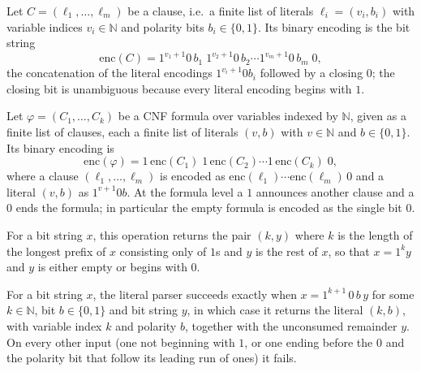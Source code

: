 \begin{definition}
\label{Std.Sat.CNF.serializeClause}
\leanok
{}
Let $C = (\ell_1, \dots, \ell_m)$ be a clause, i.e.\ a finite list of literals
$\ell_i = (v_i, b_i)$ with variable indices $v_i \in \mathbb{N}$ and polarity bits
$b_i \in \{0,1\}$. Its binary encoding is the bit string
\[
  \mathrm{enc}(C) = 1^{v_1+1}0\,b_1\;1^{v_2+1}0\,b_2 \cdots 1^{v_m+1}0\,b_m\;0,
\]
the concatenation of the literal encodings $1^{v_i+1}0b_i$ followed by a closing $0$; the
closing bit is unambiguous because every literal encoding begins with $1$.
\end{definition}

\begin{definition}
\label{Std.Sat.CNF.serialize}
\leanok
{}
Let $\varphi = (C_1, \dots, C_k)$ be a CNF formula over variables indexed by $\mathbb{N}$,
given as a finite list of clauses, each a finite list of literals $(v,b)$ with
$v \in \mathbb{N}$ and $b \in \{0,1\}$. Its binary encoding is
\[
  \mathrm{enc}(\varphi) = 1\,\mathrm{enc}(C_1)\;1\,\mathrm{enc}(C_2) \cdots 1\,\mathrm{enc}(C_k)\;0,
\]
where a clause $(\ell_1,\dots,\ell_m)$ is encoded as
$\mathrm{enc}(\ell_1)\cdots\mathrm{enc}(\ell_m)\,0$ and a literal $(v,b)$ as $1^{v+1}0b$.
At the formula level a $1$ announces another clause and a $0$ ends the formula; in
particular the empty formula is encoded as the single bit $0$.
\end{definition}

\begin{definition}
\label{Std.Sat.CNF.takeTrues}
\leanok
For a bit string $x$, this operation returns the pair $(k, y)$ where $k$ is the length of
the longest prefix of $x$ consisting only of $1$s and $y$ is the rest of $x$, so that
$x = 1^k y$ and $y$ is either empty or begins with $0$.
\end{definition}

\begin{definition}
\label{Std.Sat.CNF.parseLit}
\leanok
{}
For a bit string $x$, the literal parser succeeds exactly when $x = 1^{k+1}\,0\,b\,y$ for
some $k \in \mathbb{N}$, bit $b \in \{0,1\}$ and bit string $y$, in which case it returns
the literal $(k, b)$, with variable index $k$ and polarity $b$, together with the
unconsumed remainder $y$. On every other input (one not beginning with $1$, or one ending
before the $0$ and the polarity bit that follow its leading run of ones) it fails.
\end{definition}

